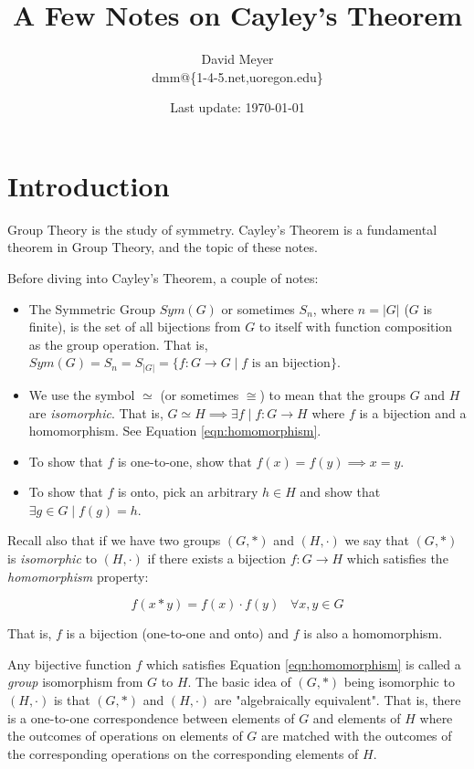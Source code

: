 \documentclass[11pt, oneside]{article}   	%
\title{A Few Notes on Cayley's Theorem}
\author{David Meyer \\ dmm@\{1-4-5.net,uoregon.edu\}}
\date{Last update: \today}							%
\theoremstyle{definition}
\begin{document}
\maketitle

\section{Introduction}
Group Theory is the study of symmetry.  Cayley's Theorem is a fundamental theorem in Group Theory, and the topic of these notes.

\bigskip
\noindent
Before diving into Cayley's Theorem, a couple of notes:
\begin{itemize}
\item The Symmetric Group $Sym(G)$ or sometimes $S_n$, where $n = |G|$ ($G$ is finite), is the set of all bijections from $G$ to itself with function composition as 
the group operation.  That is, $Sym(G) = S_n = S_{|G|} = \{f: G \rightarrow G \mid f \text{ is an bijection}\}$.
\item We use the symbol $\simeq$ (or sometimes $\cong$) to mean that the groups $G$ and $H$ are \emph{isomorphic}. That is, 
$G \simeq H \implies \exists f \mid f: G \rightarrow H$ where $f$ is a bijection and a homomorphism. See Equation \ref{eqn:homomorphism}.
 \item To show that $f$ is one-to-one, show that $f(x) = f(y) \implies x = y$.
 \item To show that $f$ is onto, pick an arbitrary $h \in H$ and show that $\exists g \in G \mid f(g) = h$.
\end{itemize}

\bigskip
\noindent
Recall also that if we have two groups $(G,*)$ and $(H,\cdot)$ we say that $(G,*)$  is \emph{isomorphic} to $(H,\cdot)$ if there exists a bijection $f:G \rightarrow H$
which satisfies the \emph{homomorphism} property:

\bigskip
\begin{equation}
f(x * y) = f(x) \cdot f(y) \;\;\; \forall  x,y \in G
\label{eqn:homomorphism}
\end{equation}

\bigskip
\noindent
That is, $f$ is a bijection (one-to-one and onto) and $f$ is also a homomorphism.


\bigskip
\noindent
Any bijective function $f$ which satisfies Equation \ref{eqn:homomorphism} is called a \emph{group} isomorphism from $G$ to $H$. The basic idea of
$(G,*)$ being isomorphic to $(H,\cdot)$ is that $(G,*)$ and $(H,\cdot)$ are "algebraically equivalent". That is, there is a one-to-one correspondence 
between elements of $G$ and elements of $H$ where the outcomes of operations on elements of $G$ are matched with the outcomes of the 
corresponding operations on the corresponding elements of $H$. 
\end{document}
